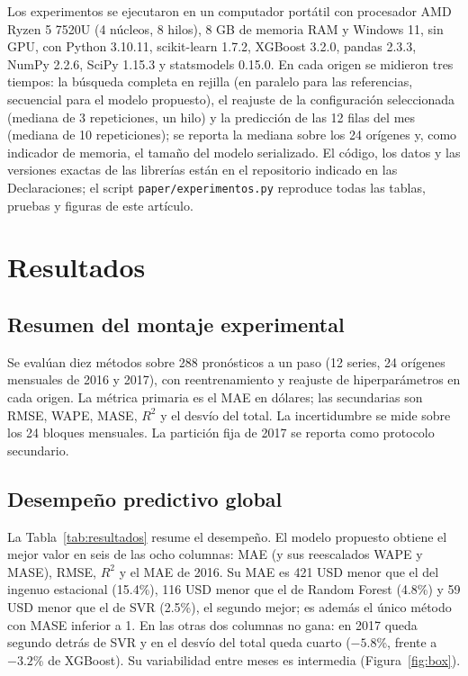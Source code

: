 \documentclass[pdflatex,sn-mathphys-num]{sn-jnl}
\begin{document}
Los experimentos se ejecutaron en un computador portátil con procesador AMD Ryzen 5 7520U (4 núcleos, 8 hilos), 8 GB de memoria RAM y Windows 11, sin GPU, con Python 3.10.11, scikit-learn 1.7.2, XGBoost 3.2.0, pandas 2.3.3, NumPy 2.2.6, SciPy 1.15.3 y statsmodels 0.15.0. En cada origen se midieron tres tiempos: la búsqueda completa en rejilla (en paralelo para las referencias, secuencial para el modelo propuesto), el reajuste de la configuración seleccionada (mediana de 3 repeticiones, un hilo) y la predicción de las 12 filas del mes (mediana de 10 repeticiones); se reporta la mediana sobre los 24 orígenes y, como indicador de memoria, el tamaño del modelo serializado. El código, los datos y las versiones exactas de las librerías están en el repositorio indicado en las Declaraciones; el script \texttt{paper/experimentos.py} reproduce todas las tablas, pruebas y figuras de este artículo.

\section{Resultados}\label{sec:resultados}

\subsection{Resumen del montaje experimental}\label{subsec:montaje}

Se evalúan diez métodos sobre 288 pronósticos a un paso (12 series, 24 orígenes mensuales de 2016 y 2017), con reentrenamiento y reajuste de hiperparámetros en cada origen. La métrica primaria es el MAE en dólares; las secundarias son RMSE, WAPE, MASE, $R^2$ y el desvío del total. La incertidumbre se mide sobre los 24 bloques mensuales. La partición fija de 2017 se reporta como protocolo secundario.

\subsection{Desempeño predictivo global}\label{subsec:global}

La Tabla~\ref{tab:resultados} resume el desempeño. El modelo propuesto obtiene el mejor valor en seis de las ocho columnas: MAE (y sus reescalados WAPE y MASE), RMSE, $R^2$ y el MAE de 2016. Su MAE es 421 USD menor que el del ingenuo estacional (15.4\%), 116 USD menor que el de Random Forest (4.8\%) y 59 USD menor que el de SVR (2.5\%), el segundo mejor; es además el único método con MASE inferior a 1. En las otras dos columnas no gana: en 2017 queda segundo detrás de SVR y en el desvío del total queda cuarto ($-5.8$\%, frente a $-3.2$\% de XGBoost). Su variabilidad entre meses es intermedia (Figura~\ref{fig:box}).
\end{document}
